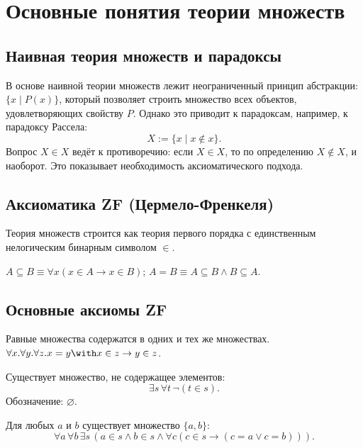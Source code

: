 \documentclass[10pt]{article}
\begin{document}
\section{Основные понятия теории множеств}
\subsection{Наивная теория множеств и парадоксы}
В основе наивной теории множеств лежит неограниченный принцип абстракции: $\{ x \mid P(x) \}$, который позволяет строить множество всех объектов, удовлетворяющих свойству $P$. Однако это приводит к парадоксам, например, к парадоксу Рассела: 
$$ X := \{ x \mid x \notin x \}. $$
Вопрос $X \in X$ ведёт к противоречию: если $X \in X$, то по определению $X \notin X$, и наоборот. Это показывает необходимость аксиоматического подхода.

\subsection{Аксиоматика ZF (Цермело-Френкеля)}
Теория множеств строится как теория первого порядка с единственным нелогическим бинарным символом $\in$.


\begin{definition}
$A \subseteq B \equiv \forall x (x \in A \rightarrow x \in B)$; $A = B \equiv A \subseteq B \land B \subseteq A$.
\end{definition}

\subsection{Основные аксиомы ZF}
\begin{definition}
Равные множества содержатся в одних и тех же множествах. 
$\forall x. \forall y. \forall z. x = y \with x \in z \rightarrow y \in z$.
\end{definition}

\begin{definition}
Существует множество, не содержащее элементов:
$$ \exists s \, \forall t \, \neg (t \in s). $$
Обозначение: $\varnothing$.
\end{definition}

\begin{definition}
Для любых $a$ и $b$ существует множество $\{a, b\}$:
$$ \forall a \, \forall b \, \exists s \, (a \in s \land b \in s \land \forall c (c \in s \rightarrow (c = a \lor c = b))). $$
\end{definition}
\end{document}
